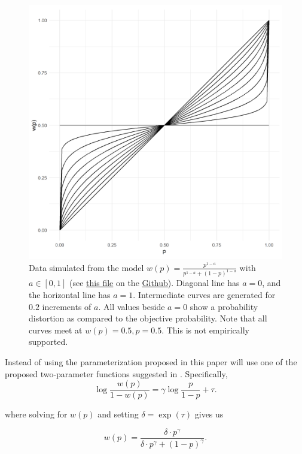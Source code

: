 \documentclass[12pt]{article}
\begin{document}
\begin{figure}[H]
	\includegraphics[width = \linewidth]{../Figures/oneParam.png}
	\caption{Data simulated from the model
		$w(p) = \frac{p^{1-a}}
		{p^{1-a}+(1-p)^{1-a}}$ with
		$a \in [0, 1]$ (see
		\href{https://github.com/victor-m-p/BayesianDecisionWeights/blob/main/Code/0_visualize_parameters.Rmd}
		{this file} on the
		\href{https://github.com/victor-m-p/BayesianDecisionWeights}{Github}).
		Diagonal line has
		$a = 0$, and the horizontal line
		has $a = 1$. Intermediate curves
		are generated for $0.2$ increments
		of $a$. All values beside
		$a = 0$ show a probability distortion
		as compared to the objective probability.
		Note that all curves meet at
		$w(p) = 0.5, p = 0.5$. This is
	not empirically supported.}
\end{figure}

Instead of using the parameterization
proposed in \textcite{rottenstreich2001money}
this paper will use one of the
proposed two-parameter functions
suggested in \textcite{gonzalez1999shape}.
Specifically,
\[
	\log\frac{w(p)}{1-w(p)} =
	\gamma \log\frac{p}{1-p} + \tau
.\]

where solving for $w(p)$ and setting $\delta = \exp(\tau)$
gives us

\[
	w(p) = \frac{\delta \cdot p^{\gamma}}
	{\delta \cdot p^{\gamma} +
	(1-p)^{\gamma}}
.\]
\end{document}
